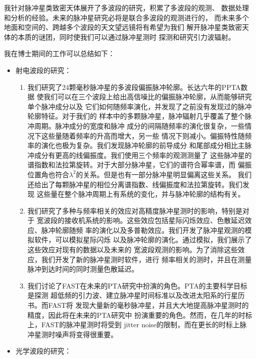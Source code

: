 

我针对脉冲星类致密天体展开了多波段的研究，积累了多波段的观测、
数据处理和分析的经验。未来的脉冲星研究必将是联合多波段的观测进行的，
而未来多个地面和空间的、跨越多个波段的天文望远镜将有希望为我们
解开脉冲星类致密天体的本质的谜团，同时使我们可以通过脉冲星测时
探测和研究引力波辐射。

我在博士期间的工作可以总结如下：
\begin{itemize}
\item 射电波段的研究：

\begin{enumerate}
\item 我们研究了24颗毫秒脉冲星的多波段偏振脉冲轮廓。长达六年的PPTA数据
使我们可以在三个波段上给出高信噪比的偏振脉冲轮廓，从而能够研究单个脉冲成分以及
它们如何随频率演化，并发现了之前没有发现过的脉冲轮廓特征。对于我们的
样本中的多颗脉冲星，脉冲辐射几乎覆盖了整个脉冲周期。脉冲成分的宽度和脉冲
成分的间隔随频率的演化很复杂，一些情况下这些量随着频率的升高而增大，另一些
情况下则减小。偏振特性随频率的演化也极为复杂。我们发现脉冲轮廓的前导成分
和尾部成分相比主脉冲成分有更高的线偏振度。我们使用三个频率的观测测量了
这些脉冲星的谱指数和法拉第旋转。对于大部分脉冲星，它们的谱符合幂率谱，而
偏振位置角也符合$\lambda^2$的关系。但是也有一部分脉冲星明显偏离这些关系。
我们还给出了每颗脉冲星的相位分离谱指数、线偏振度和法拉第旋转。我们发现
这些量在整个脉冲周期上有系统的变化，并与脉冲轮廓的结构有关。
\item 我们研究了多种与频率相关的效应对高精度脉冲星测时的影响，特别是对于
宽波段的接收机系统的影响。这些效应包括星际闪烁效应、色散延迟效应、脉冲轮廓随频
率的演化以及多普勒效应。我们开发了脉冲星观测的模拟软件，可以模拟星际闪烁
以及脉冲轮廓的演化。通过模拟，我们展示了这些效应对现有的数据以及未来的
宽波段观测的影响。为了消除这些效应，我们开发了新的脉冲星测时软件，进行
频率相关的测时，并且在测量脉冲到达时间的同时测量色散延迟。
\item 我们讨论了FAST在未来的PTA研究中扮演的角色。PTA的主要科学目标是探测
超低频的引力波、建立脉冲星时间标准以及改进太阳系的行星历书。而FAST将
发现大量新的毫秒脉冲星，并且大大地提高脉冲星测时的精度，因此将在未来的PTA研究中
扮演重要的角色。然而，在几年的时标上，FAST的脉冲星测时将受到
jitter noise的限制，而在更长的时标上脉冲星测时噪声将变得很重要。

\end{enumerate}

\item 光学波段的研究：


\end{itemize}

